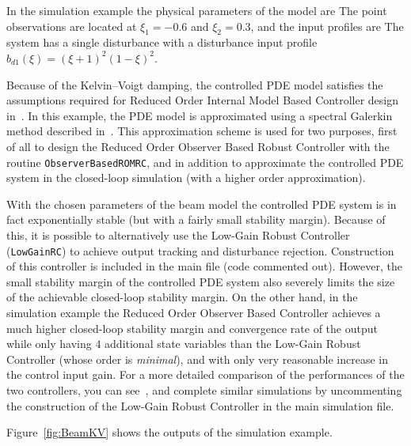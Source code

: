 \documentclass[11pt, a4paper]{amsart}
\theoremstyle{definition}
\numberwithin{equation}{section}
\begin{document}
In the simulation example the physical parameters of the model are 
The point observations are located at $\xi_1=-0.6$ and $\xi_2=0.3$, and the input profiles are
The system has a
single disturbance with a disturbance input profile 
$b_{d1}(\xi) = (\xi+1)^2(1-\xi)^2$.


Because of the Kelvin--Voigt damping, the controlled PDE model satisfies the assumptions required for Reduced Order Internal Model Based Controller design in~\cite{PauPha20}.
In this example, the PDE model is approximated using a spectral Galerkin method described in~\cite{She95}. This approximation scheme is used for two purposes, first of all to design the Reduced Order Observer Based Robust Controller with the routine \texttt{ObserverBasedROMRC}, and in addition to approximate the controlled PDE system in the closed-loop simulation (with a higher order approximation).

With the chosen parameters of the beam model the controlled PDE system is in fact exponentially stable (but with a fairly small stability margin). Because of this, it is possible to alternatively use the Low-Gain Robust Controller (\texttt{LowGainRC}) to achieve output tracking and disturbance rejection. Construction of this controller is included in the main file (code commented out). However, the small stability margin of the controlled PDE system also severely limits the size of the achievable closed-loop stability margin. On the other hand, in the simulation example the Reduced Order Observer Based Controller achieves a much higher closed-loop stability margin and convergence rate of the output while only having $4$ additional state variables than the Low-Gain Robust Controller (whose order is \emph{minimal}), and with only very reasonable increase in the control input gain. For a more detailed comparison of the performances of the two controllers, you can see~, and complete similar simulations by uncommenting the construction of the Low-Gain Robust Controller in the main simulation file.



Figure~\ref{fig:BeamKV} shows the outputs of the simulation example.
\end{document}
